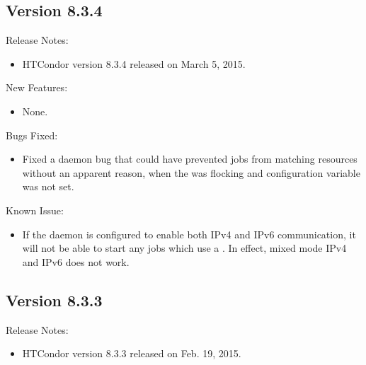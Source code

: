 \subsection*{\label{sec:New-8-3-4}Version 8.3.4}

\noindent Release Notes:

\begin{itemize}

\item HTCondor version 8.3.4 released on March 5, 2015.

\end{itemize}


\noindent New Features:

\begin{itemize}

\item None.

\end{itemize}

\noindent Bugs Fixed:

\begin{itemize}

\item Fixed a  daemon bug
that could have prevented jobs from matching resources
without an apparent reason,
when the  was flocking
and configuration variable  was not set.

\end{itemize}

\noindent Known Issue:
\begin{itemize}
\item If the  daemon is configured to enable both
IPv4 and IPv6 communication,
it will not be able to start any jobs which use a .
In effect, mixed mode IPv4 and IPv6 does not work.
\end{itemize}
\subsection*{\label{sec:New-8-3-3}Version 8.3.3}

\noindent Release Notes:

\begin{itemize}

\item HTCondor version 8.3.3 released on Feb. 19, 2015.

\end{itemize}


